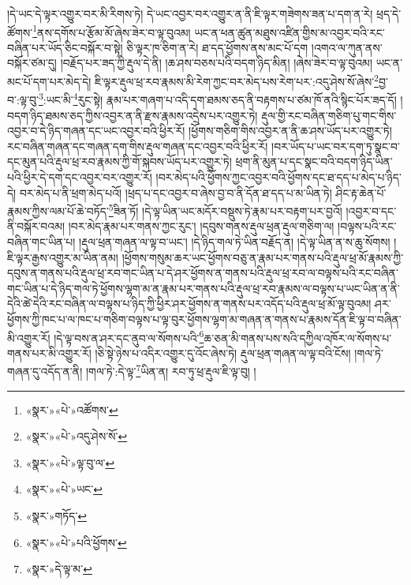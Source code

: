 །དེ་ཡང་དེ་ལྟར་འགྱུར་བར་མི་རིགས་ཏེ། དེ་ཡང་འབྱར་བར་འགྱུར་ན་ནི་ཇི་ལྟར་གཟེགས་ཟན་པ་དག་ན་རེ། ཕྲད་དེ་ཚོགས་\footnote{«སྣར་»«པེ་»འཚོགས་}ནས་དགོས་པ་རྩོམ་མོ་ཞེས་ཟེར་བ་ལྟ་བུའམ། ཡང་ན་ཕན་ཚུན་མཐུས་འཛིན་གྱིས་མ་འབྱར་བའི་རང་བཞིན་པར་ཡོད་ཅིང་བསྐོར་བ་སྟེ། ཅི་ལྟར་ཁ་ཅིག་ན་རེ། ཐ་དད་ཕྱོགས་ནས་མང་པོ་དག །འགའ་ལ་ཀུན་ནས་བསྐོར་ཙམ་དུ། །བརྗོད་པར་ཟད་ཀྱི་རྡུལ་དེ་ནི། །ཆ་ཤས་བཅས་པའི་བདག་ཉིད་མིན། །ཞེས་ཟེར་བ་ལྟ་བུའམ། ཡང་ན་མང་པོ་དག་པར་མེད་དེ། ཇི་ལྟར་རྡུལ་ཕྲ་རབ་རྣམས་མི་རེག་ཀྱང་བར་མེད་པས་རེག་པར་:འདུ་ཤེས་སོ་ཞེས་\footnote{«སྣར་»«པེ་»འདུ་ཤེས་སོ་}བྱ་བ་:ལྟ་བུ་\footnote{«སྣར་»«པེ་»ལྟ་བུ་ལ་}:ཡང་མི་\footnote{«སྣར་»«པེ་»ཡང་}རུང་སྟེ། རྣམ་པར་གཞག་པ་འདི་དག་ཐམས་ཅད་ནི་བརྟགས་པ་ཙམ་ཁོ་ནའི་སྙིང་པོར་ཟད་དོ། །བདག་ཉིད་ཐམས་ཅད་ཀྱིས་འབྱར་ན་ནི་རྫས་རྣམས་འདྲེས་པར་འགྱུར་ཏེ། རྡུལ་གྱི་རང་བཞིན་གཅིག་པུ་གང་གིས་འབྱར་བ་དེ་ཉིད་གཞན་དང་ཡང་འབྱར་བའི་ཕྱིར་རོ། །ཕྱོགས་གཅིག་གིས་འབྱར་ན་ནི་ཆ་ཤས་ཡོད་པར་འགྱུར་ཏེ། རང་བཞིན་གཞན་དང་གཞན་དག་གིས་རྡུལ་གཞན་དང་འབྱར་བའི་ཕྱིར་རོ། །བར་ཡོད་པ་ཡང་བར་དག་ཏུ་སྣང་བ་དང་མུན་པའི་རྡུལ་ཕྲ་རབ་རྣམས་ཀྱི་གོ་སྐབས་ཡོད་པར་འགྱུར་ཏེ། ཕྲག་ནི་མུན་པ་དང་སྣང་བའི་བདག་ཉིད་ཡིན་པའི་ཕྱིར་དེ་དག་དང་འབྱར་བར་འགྱུར་རོ། །བར་མེད་པའི་ཕྱོགས་ཀྱང་འབྱར་བའི་ཕྱོགས་དང་ཐ་དད་པ་མེད་པ་ཉིད་དེ། བར་མེད་པ་ནི་ཕྲག་མེད་པའོ། །ཕྲད་པ་དང་འབྱར་བ་ཞེས་བྱ་བ་ནི་དོན་ཐ་དད་པ་མ་ཡིན་ཏེ། ཤིང་རྟ་ཆེན་པོ་རྣམས་ཀྱིས་ལམ་པོ་ཆེ་བཏོད་\footnote{«སྣར་»གཏོད་}ཟིན་ཏོ། །དེ་ལྟ་ཡིན་ཡང་མདོར་བསྡུས་ཏེ་རྣམ་པར་བརྟག་པར་བྱའོ། །འབྱར་བ་དང་ནི་བསྐོར་བའམ། །བར་མེད་རྣམ་པར་གནས་ཀྱང་རུང་། །དབུས་གནས་རྡུལ་ཕྲན་རྡུལ་གཅིག་ལ། །བལྟས་པའི་རང་བཞིན་གང་ཡིན་པ། །རྡུལ་ཕྲན་གཞན་ལ་ལྟ་བ་ཡང་། །དེ་ཉིད་གལ་ཏེ་ཡིན་བརྗོད་ན། །དེ་ལྟ་ཡིན་ན་ས་ཆུ་སོགས། །ཇི་ལྟར་རྒྱས་འགྱུར་མ་ཡིན་ནམ། །ཕྱོགས་གསུམ་ཆར་ཡང་ཕྱོགས་བཅུ་ན་རྣམ་པར་གནས་པའི་རྡུལ་ཕྲ་མོ་རྣམས་ཀྱི་དབུས་ན་གནས་པའི་རྡུལ་ཕྲ་རབ་གང་ཡིན་པ་དེ་ཤར་ཕྱོགས་ན་གནས་པའི་རྡུལ་ཕྲ་རབ་ལ་བལྟས་པའི་རང་བཞིན་གང་ཡིན་པ་དེ་ཉིད་གལ་ཏེ་ཕྱོགས་ལྷག་མ་ན་རྣམ་པར་གནས་པའི་རྡུལ་ཕྲ་རབ་རྣམས་ལ་བལྟས་པ་ཡང་ཡིན་ན་ནི་དེའི་ཚེ་དེའི་རང་བཞིན་ལ་བལྟས་པ་ཉིད་ཀྱི་ཕྱིར་ཤར་ཕྱོགས་ན་གནས་པར་འདོད་པའི་རྡུལ་ཕྲ་མོ་ལྟ་བུའམ། ཤར་ཕྱོགས་ཀྱི་ཁང་པ་ལ་ཁང་པ་གཅིག་བལྟས་པ་ལྟ་བུར་ཕྱོགས་ལྷག་མ་གཞན་ན་གནས་པ་རྣམས་དོན་ཇི་ལྟ་བ་བཞིན་མི་འགྱུར་རོ། །དེ་ལྟ་བས་ན་ཤར་དང་ནུབ་ལ་སོགས་པའི་\footnote{«སྣར་»«པེ་»པའི་ཕྱོགས་}ཆ་ཅན་མི་གནས་པས་སའི་དཀྱིལ་འཁོར་ལ་སོགས་པ་གནས་པར་མི་འགྱུར་རོ། །ཅི་སྟེ་ཉེས་པ་འདིར་འགྱུར་དུ་འོང་ཞེས་ཏེ། རྡུལ་ཕྲན་གཞན་ལ་ལྟ་བའི་ངོས། །གལ་ཏེ་གཞན་དུ་འདོད་ན་ནི། །གལ་ཏེ་:དེ་ལྟ་\footnote{«སྣར་»དེ་ལྟ་མ་}ཡིན་ན། རབ་ཏུ་ཕྲ་རྡུལ་ཇི་ལྟ་བུ། །
